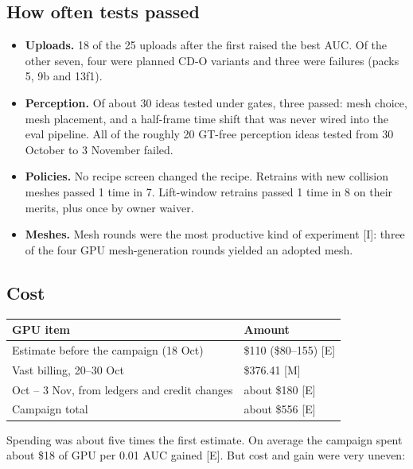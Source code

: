 \documentclass[11pt]{article}
\begin{document}
\subsection{How often tests passed}
\begin{itemize}[itemsep=2pt,topsep=3pt]
\item \textbf{Uploads.} 18 of the 25 uploads after the first raised the best AUC. Of the other seven, four were planned CD-O variants and three were failures (packs 5, 9b and 13f1).
\item \textbf{Perception.} Of about 30 ideas tested under gates, three passed: mesh choice, mesh placement, and a half-frame time shift that was never wired into the eval pipeline. All of the roughly 20 GT-free perception ideas tested from 30 October to 3 November failed.
\item \textbf{Policies.} No recipe screen changed the recipe. Retrains with new collision meshes passed 1 time in 7. Lift-window retrains passed 1 time in 8 on their merits, plus once by owner waiver.
\item \textbf{Meshes.} Mesh rounds were the most productive kind of experiment {[}I{]}: three of the four GPU mesh-generation rounds yielded an adopted mesh.
\end{itemize}
\subsection{Cost}
\begin{table}[tbp]
\centering\small
\begin{tabularx}{\linewidth}{>{\raggedright\arraybackslash}Xl}
\toprule
\textbf{GPU item} & \textbf{Amount} \\
\midrule
Estimate before the campaign (18 Oct) & \$110 (\$80–155) {[}E{]} \\
Vast billing, 20–30 Oct & \$376.41 {[}M{]} \\
31 Oct – 3 Nov, from ledgers and credit changes & about \$180 {[}E{]} \\
Campaign total & about \$556 {[}E{]} \\
\bottomrule
\end{tabularx}
\end{table}
Spending was about five times the first estimate. On average the campaign spent about \$18 of GPU per 0.01 AUC gained {[}E{]}. But cost and gain were very uneven:
\end{document}
